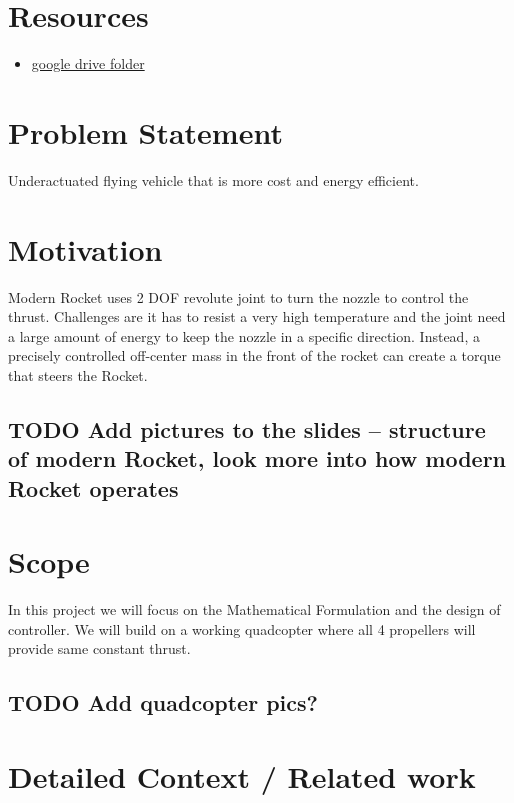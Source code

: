 \documentclass[11pt]{article}
\author{Wilson Chang}
\date{\today}
\title{}
\begin{document}
\tableofcontents

\section{Resources}
\label{sec:orgdc0f023}
\begin{itemize}
\item \href{https://drive.google.com/drive/u/0/folders/1Yxj9OBGIWcbHoHPgwoU0kEoxn\_60bCrN}{google drive folder}
\end{itemize}

\section{Problem Statement}
\label{sec:orgb7afa7e}
Underactuated flying vehicle that is more cost and energy efficient.
\section{Motivation}
\label{sec:org8bd048b}
Modern Rocket uses 2 DOF revolute joint to turn the nozzle to control the thrust. Challenges are it has to resist a very high temperature and the joint need a large amount of energy to keep the nozzle in a specific direction.
Instead, a precisely controlled off-center mass in the front of the rocket can create a torque that steers the Rocket.
\subsection{{\bfseries\sffamily TODO} Add pictures to the slides -- structure of modern Rocket, look more into how modern Rocket operates}
\label{sec:org9d6b0e3}
\section{Scope}
\label{sec:org3d62fa5}
In this project we will focus on the Mathematical Formulation and the design of controller. We will build on a working quadcopter where all 4 propellers will provide same constant thrust.
\subsection{{\bfseries\sffamily TODO} Add quadcopter pics?}
\label{sec:orgc481719}

\section{Detailed Context / Related work}
\label{sec:orge571f01}
\end{document}
